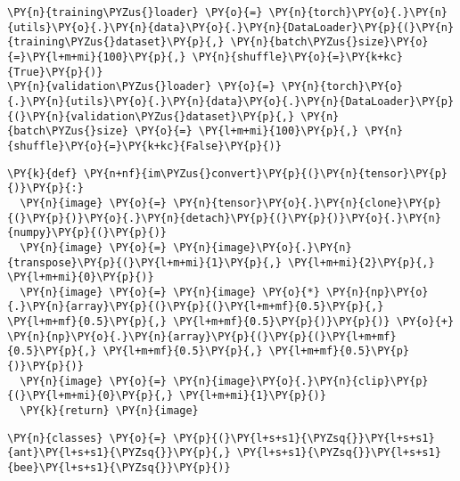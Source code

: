 \begin{tcolorbox}[breakable, size=fbox, boxrule=1pt, pad at break*=1mm,colback=cellbackground, colframe=cellborder]
\begin{Verbatim}[commandchars=\\\{\}]
\PY{n}{training\PYZus{}loader} \PY{o}{=} \PY{n}{torch}\PY{o}{.}\PY{n}{utils}\PY{o}{.}\PY{n}{data}\PY{o}{.}\PY{n}{DataLoader}\PY{p}{(}\PY{n}{training\PYZus{}dataset}\PY{p}{,} \PY{n}{batch\PYZus{}size}\PY{o}{=}\PY{l+m+mi}{100}\PY{p}{,} \PY{n}{shuffle}\PY{o}{=}\PY{k+kc}{True}\PY{p}{)}
\PY{n}{validation\PYZus{}loader} \PY{o}{=} \PY{n}{torch}\PY{o}{.}\PY{n}{utils}\PY{o}{.}\PY{n}{data}\PY{o}{.}\PY{n}{DataLoader}\PY{p}{(}\PY{n}{validation\PYZus{}dataset}\PY{p}{,} \PY{n}{batch\PYZus{}size} \PY{o}{=} \PY{l+m+mi}{100}\PY{p}{,} \PY{n}{shuffle}\PY{o}{=}\PY{k+kc}{False}\PY{p}{)}
\end{Verbatim}
\end{tcolorbox}

    \begin{tcolorbox}[breakable, size=fbox, boxrule=1pt, pad at break*=1mm,colback=cellbackground, colframe=cellborder]
\begin{Verbatim}[commandchars=\\\{\}]
\PY{k}{def} \PY{n+nf}{im\PYZus{}convert}\PY{p}{(}\PY{n}{tensor}\PY{p}{)}\PY{p}{:}
  \PY{n}{image} \PY{o}{=} \PY{n}{tensor}\PY{o}{.}\PY{n}{clone}\PY{p}{(}\PY{p}{)}\PY{o}{.}\PY{n}{detach}\PY{p}{(}\PY{p}{)}\PY{o}{.}\PY{n}{numpy}\PY{p}{(}\PY{p}{)}
  \PY{n}{image} \PY{o}{=} \PY{n}{image}\PY{o}{.}\PY{n}{transpose}\PY{p}{(}\PY{l+m+mi}{1}\PY{p}{,} \PY{l+m+mi}{2}\PY{p}{,} \PY{l+m+mi}{0}\PY{p}{)}
  \PY{n}{image} \PY{o}{=} \PY{n}{image} \PY{o}{*} \PY{n}{np}\PY{o}{.}\PY{n}{array}\PY{p}{(}\PY{p}{(}\PY{l+m+mf}{0.5}\PY{p}{,} \PY{l+m+mf}{0.5}\PY{p}{,} \PY{l+m+mf}{0.5}\PY{p}{)}\PY{p}{)} \PY{o}{+} \PY{n}{np}\PY{o}{.}\PY{n}{array}\PY{p}{(}\PY{p}{(}\PY{l+m+mf}{0.5}\PY{p}{,} \PY{l+m+mf}{0.5}\PY{p}{,} \PY{l+m+mf}{0.5}\PY{p}{)}\PY{p}{)}
  \PY{n}{image} \PY{o}{=} \PY{n}{image}\PY{o}{.}\PY{n}{clip}\PY{p}{(}\PY{l+m+mi}{0}\PY{p}{,} \PY{l+m+mi}{1}\PY{p}{)}
  \PY{k}{return} \PY{n}{image}
\end{Verbatim}
\end{tcolorbox}

    \begin{tcolorbox}[breakable, size=fbox, boxrule=1pt, pad at break*=1mm,colback=cellbackground, colframe=cellborder]
\begin{Verbatim}[commandchars=\\\{\}]
\PY{n}{classes} \PY{o}{=} \PY{p}{(}\PY{l+s+s1}{\PYZsq{}}\PY{l+s+s1}{ant}\PY{l+s+s1}{\PYZsq{}}\PY{p}{,} \PY{l+s+s1}{\PYZsq{}}\PY{l+s+s1}{bee}\PY{l+s+s1}{\PYZsq{}}\PY{p}{)}
\end{Verbatim}
\end{tcolorbox}

